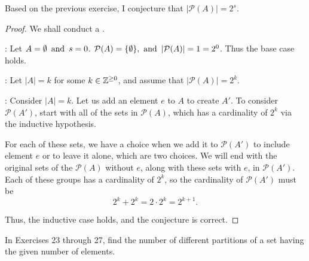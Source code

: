 \documentclass{article}
\begin{document}
Based on the previous exercise, I conjecture that $|\mathcal{P}(A)| = 2^s$.
\begin{proof}
    We shall conduct a .

    : Let $A = \emptyset \operatorname{~\text{and}~} s = 0$. $\mathcal{P}(A) = \{\emptyset\}, \operatorname{~\text{and}~} |\mathcal{P}(A)| = 1 = 2^0$. Thus the base case holds.

    : Let $|A| = k$ for some $k \in \mathbb{Z}^{\geq0}$, and assume that $|\mathcal{P}(A)| = 2^k$.

    : Consider $|A| = k$. Let us add an element $e$ to $A$ to create $A'$. To consider $\mathcal{P}(A')$, start with all of the sets in $\mathcal{P}(A)$, which has a cardinality of $2^k$ via the inductive hypothesis.

    \indent For each of these sets, we have a choice when we add it to $\mathcal{P}(A')$ to include element $e$ or to leave it alone, which are two choices. We will end with the original sets of the $\mathcal{P}(A)$ without $e$, along with these sets with $e$, in $\mathcal{P}(A')$. Each of these groups has a cardinality of $2^k$, so the cardinality of $\mathcal{P}(A')$ must be
    \[
        2^k + 2^k = 2 \cdot 2^k = 2^{k+1}.
    \]

    Thus, the inductive case holds, and the conjecture is correct.
\end{proof}

\noindent In Exercises 23 through 27, find the number of different partitions of a set having the given number of elements.
\begin{enumerate}
\end{enumerate}
\end{document}
